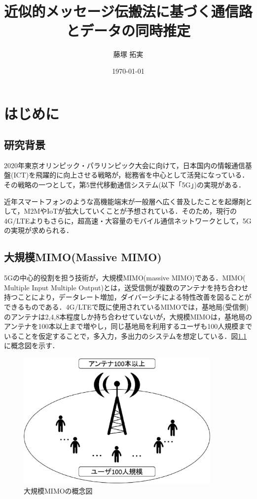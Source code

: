 \documentclass[report]{jsbook}
\title{近似的メッセージ伝搬法に基づく通信路とデータの同時推定}
\author{藤塚 拓実}
\date{\today}
\begin{document}
\maketitle
\tableofcontents
\newpage
% 
\chapter{はじめに}
\section{研究背景}
2020年東京オリンピック・パラリンピック大会に向けて，日本国内の情報通信基盤(ICT)を飛躍的に向上させる戦略が，総務省を中心として活発になっている．その戦略の一つとして，第5世代移動通信システム(以下「5G」)の実現がある．\cite{soumu_suzuki}

近年スマートフォンのような高機能端末が一般層へ広く普及したことを起爆剤として，M2MやIoTが拡大していくことが予想されている．そのため，現行の4G/LTEよりもさらに，超高速・大容量のモバイル通信ネットワークとして，5Gの実現が求められる\cite{suyama}．

\section{大規模MIMO(Massive MIMO)}
5Gの中心的役割を担う技術が，大規模MIMO(massive MIMO)である．MIMO( Multiple Input Multiple Output)とは，送受信側が複数のアンテナを持ち合わせ持つことにより，データレート増加，ダイバーシチによる特性改善を図ることができるものである\cite{goldsmith}．4G/LTEで既に使用されているMIMOでは，基地局(受信側)のアンテナは2,4,8本程度しか持ち合わせていないが，大規模MIMOは，基地局のアンテナを100本以上まで増やし，同じ基地局を利用するユーザも100人規模までいることを仮定することで，多入力，多出力のシステムを想定している．図\ref{fig:mimo}に概念図を示す．
\begin{figure}[htbp]
  \begin{center}
    \includegraphics[clip,width=10.0cm]{./mimo.eps}
    \caption{大規模MIMOの概念図}
    \label{fig:mimo}
  \end{center}
\end{figure}
\end{document}
